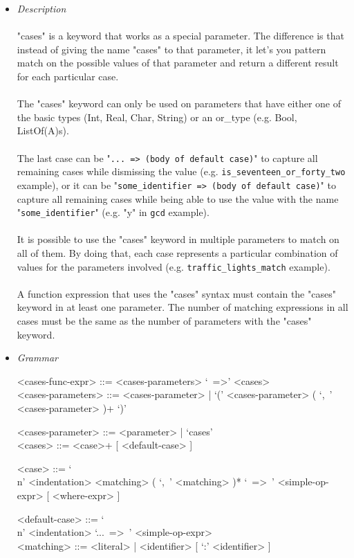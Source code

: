 \documentclass{article}
\begin{document}
\begin{itemize}
\item \textit{Description}\\\\
"cases" is a keyword that works as a special parameter. The difference is that 
instead of giving the name "cases" to that parameter, it let's you 
pattern match on the possible values of that parameter and return a different
result for each particular case. 
\\\\
The "cases" keyword can only be used on parameters that have either one of the 
basic types (Int, Real, Char, String) or an or\_type (e.g. Bool, ListOf(A)s).
\\\\
The last case can be "\texttt{... => (body of default case)}" to capture all
remaining cases while dismissing the value (e.g.
\texttt{is_seventeen_or_forty_two} example), or it can be
"\texttt{some_identifier => (body of default case)}" to capture all remaining
cases while being able to use the value with the name "\texttt{some_identifier}"
(e.g.  "y" in \texttt{gcd} example).
\\\\
It is possible to use the "cases" keyword in multiple parameters to match on all
of them. By doing that, each case represents a particular combination of values
for the parameters involved (e.g. \texttt{traffic_lights_match} example).
\\\\
A function expression that uses the "cases" syntax must contain the "cases"
keyword in at least one parameter. The number of matching expressions in 
all cases must be the same as the number of parameters with the "cases" keyword.

\item \textit{Grammar}
\begin{grammar}
<cases-func-expr> ::= <cases-parameters> `\ =>' <cases> \\

<cases-parameters> ::=
<cases-parameter> | `(' <cases-parameter> ( `,\ ' <cases-parameter> )+ `)'

<cases-parameter> ::= <parameter> | `cases'\\

<cases> ::= <case>+ [ <default-case> ]

<case> ::=
`\\n' <indentation> <matching> ( `,\ ' <matching> )* `\ =>\ ' <simple-op-expr>
[ <where-expr> ]

<default-case> ::= `\\n' <indentation> `...\ =>\ ' <simple-op-expr>\\

<matching> ::= <literal> | <identifier> [ `:' <identifier> ]
\end{grammar}

\end{itemize}
\end{document}
